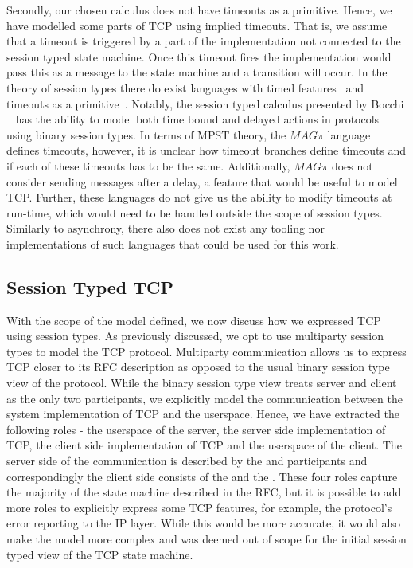 Secondly, our chosen calculus does not have timeouts as a primitive.
Hence, we have modelled some parts of TCP using implied timeouts.
That is, we assume that a timeout is triggered by a part of the implementation not connected to the session typed state machine.
Once this timeout fires the implementation would pass this as a message to the state machine and a transition will occur.
In the theory of session types there do exist languages with timed features~\cite{BMVY19} and timeouts as a primitive~\cite{BD23}.
Notably, the session typed calculus presented by Bocchi \etal~\cite{BMVY19} has the ability to model both time bound and delayed actions in protocols using binary session types.
In terms of MPST theory, the $MAG\pi$ language~\cite{BD23} defines timeouts, however, it is unclear how timeout branches define timeouts and if each of these timeouts has to be the same.
Additionally, $MAG\pi$ does not consider sending messages after a delay, a feature that would be useful to model TCP.
Further, these languages do not give us the ability to modify timeouts at run-time, which would need to be handled outside the scope of session types.
Similarly to asynchrony, there also does not exist any tooling nor implementations of such languages that could be used for this work.   

\subsection{Session Typed TCP}

With the scope of the model defined, we now discuss how we expressed TCP using session types.
As previously discussed, we opt to use multiparty session types to model the TCP protocol.
Multiparty communication allows us to express TCP closer to its RFC description as opposed to the usual binary session type view of the protocol.
While the binary session type view treats server and client as the only two participants, we explicitly model the communication between the system implementation of TCP and the userspace.
Hence, we have extracted the following roles - the userspace of the server, the server side implementation of TCP, the client side implementation of TCP and the userspace of the client.
The server side of the communication is described by the {\serveruser} and {\serversystem} participants and correspondingly the client side  consists of the {\clientuser} and the {\clientsystem}.
These four roles capture the majority of the state machine described in the RFC, but it is possible to add more roles to explicitly express some TCP features, for example, the protocol's error reporting to the IP layer.
While this would be more accurate, it would also make the model more complex and was deemed out of scope for the initial session typed view of the TCP state machine.
    
